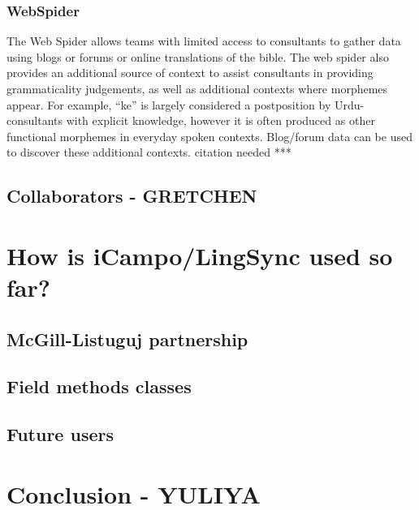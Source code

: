 \documentclass[letterpaper, 12pt, dvips]{mitwpl}
\begin{document}
\subsubsection{WebSpider}

The Web Spider allows teams with limited access to consultants to gather data using blogs or forums or online translations of the bible. The web spider also provides an additional source of context to assist consultants in providing grammaticality judgements, as well as additional contexts where morphemes appear. For example, ``ke'' is largely considered a postposition by Urdu-consultants with explicit knowledge, however it is often produced as other functional morphemes in everyday spoken contexts. Blog/forum data can be used to discover these additional contexts. citation needed ***


\subsection{Collaborators - GRETCHEN} 

\section{How is iCampo/LingSync used so far?} 

\subsection{McGill-Listuguj partnership}

\subsection{Field methods classes} 

\subsection{Future users} 

\section{Conclusion - YULIYA} 



\custombib{}
\end{document}
